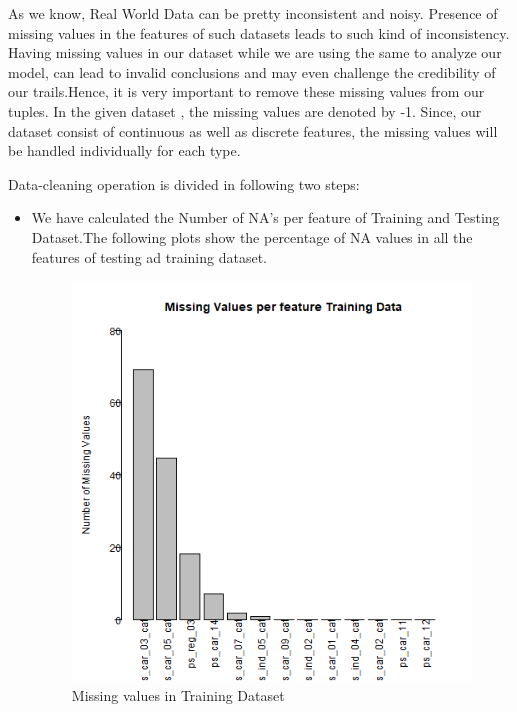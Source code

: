 \documentclass[fleqn,10pt]{SelfArx} %
\begin{document}
As we know, Real World Data can be pretty inconsistent and noisy\cite{2}. Presence of missing values in the features of such datasets leads to such kind of inconsistency. Having missing values in our dataset while we are using the same to analyze our model, can lead to invalid conclusions and may even challenge the credibility of our trails.Hence, it is very important to remove these missing values from our tuples. In the given dataset , the missing values are denoted by -1. Since, our dataset consist of continuous as well as discrete features, the missing values will be handled individually for each type.

Data-cleaning operation is divided in following two steps:
\begin{itemize}
	\item We have calculated the Number of NA's per feature of Training and Testing Dataset.The following plots show the percentage of NA values in all the features of testing ad training dataset.\\
	\begin{figure}[h]
	\includegraphics[width=1\columnwidth]{plots/train_missing.png}\centering
	\caption{Missing values in Training Dataset}
	\end{figure}\\
	

\end{itemize}
\end{document}
